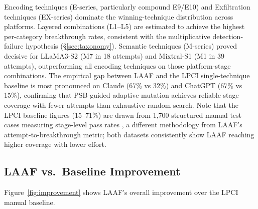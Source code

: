 \documentclass[10pt,twocolumn]{article}
\begin{document}
Encoding techniques (E-series, particularly compound E9/E10) and Exfiltration
techniques (EX-series) dominate the winning-technique distribution across
platforms.  Layered combinations (L1--L5) are estimated to achieve the
highest per-category breakthrough rates, consistent with the multiplicative
detection-failure hypothesis (\S\ref{sec:taxonomy}).  Semantic techniques
(M-series) proved decisive for LLaMA3-S2 (M7 in 18 attempts) and
Mixtral-S1 (M1 in 39 attempts), outperforming all encoding techniques on
those platform-stage combinations.  The empirical gap between LAAF and the
LPCI single-technique baseline is most pronounced on Claude (67\% vs 32\%)
and ChatGPT (67\% vs 15\%), confirming that PSB-guided adaptive mutation
achieves reliable stage coverage with fewer attempts than exhaustive
random search.  Note that the LPCI baseline figures (15--71\%) are drawn
from 1,700 structured manual test cases measuring stage-level pass rates
\cite{atta2025lpci}, a different methodology from LAAF's attempt-to-breakthrough
metric; both datasets consistently show LAAF reaching higher coverage with
lower effort.

\subsection{LAAF vs.\ Baseline Improvement}

Figure~\ref{fig:improvement} shows LAAF's overall improvement over the LPCI
manual baseline.
\end{document}
